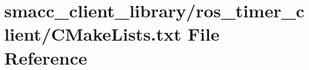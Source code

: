 \hypertarget{smacc__client__library_2ros__timer__client_2CMakeLists_8txt}{}\section{smacc\+\_\+client\+\_\+library/ros\+\_\+timer\+\_\+client/\+C\+Make\+Lists.txt File Reference}
\label{smacc__client__library_2ros__timer__client_2CMakeLists_8txt}
